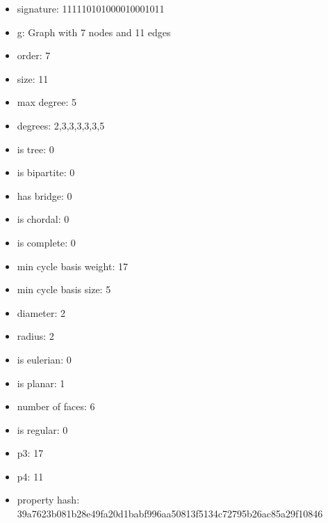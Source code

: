 \begin{itemize}
\item signature: 111110101000010001011
\item g: Graph with 7 nodes and 11 edges
\item order: 7
\item size: 11
\item max degree: 5
\item degrees: 2,3,3,3,3,3,5
\item is tree: 0
\item is bipartite: 0
\item has bridge: 0
\item is chordal: 0
\item is complete: 0
\item min cycle basis weight: 17
\item min cycle basis size: 5
\item diameter: 2
\item radius: 2
\item is eulerian: 0
\item is planar: 1
\item number of faces: 6
\item is regular: 0
\item p3: 17
\item p4: 11
\item property hash: 39a7623b081b28e49fa20d1babf996aa50813f5134c72795b26ac85a29f10846
\end{itemize}
\newpage
\begin{figure}
\end{figure}
